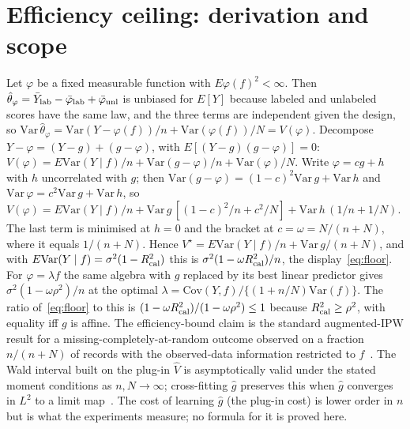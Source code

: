 \appendix
\section{Efficiency ceiling: derivation and scope}
\label{app:theory}
Let $\varphi$ be a fixed measurable function with $E\varphi(f)^2<\infty$. Then $\hat\theta_\varphi=\bar Y_{\rm lab}-\bar\varphi_{\rm lab}+\bar\varphi_{\rm unl}$ is unbiased for $E[Y]$ because labeled and unlabeled scores have the same law, and the three terms are independent given the design, so $\mathrm{Var}\,\hat\theta_\varphi=\mathrm{Var}(Y-\varphi(f))/n+\mathrm{Var}(\varphi(f))/N=V(\varphi)$. Decompose $Y-\varphi=(Y-g)+(g-\varphi)$, with $E[(Y-g)(g-\varphi)]=0$: $V(\varphi)=E\mathrm{Var}(Y\mid f)/n+\mathrm{Var}(g-\varphi)/n+\mathrm{Var}(\varphi)/N$. Write $\varphi=cg+h$ with $h$ uncorrelated with $g$; then $\mathrm{Var}(g-\varphi)=(1-c)^2\mathrm{Var}\,g+\mathrm{Var}\,h$ and $\mathrm{Var}\,\varphi=c^2\mathrm{Var}\,g+\mathrm{Var}\,h$, so $V(\varphi)=E\mathrm{Var}(Y\mid f)/n+\mathrm{Var}\,g\,[(1-c)^2/n+c^2/N]+\mathrm{Var}\,h\,(1/n+1/N)$. The last term is minimised at $h=0$ and the bracket at $c=\omega=N/(n+N)$, where it equals $1/(n+N)$. Hence $V^\star=E\mathrm{Var}(Y\mid f)/n+\mathrm{Var}\,g/(n+N)$, and with $E\mathrm{Var}(Y\mid f)=\sigma^2(1-R^2_{\rm cal})$ this is $\sigma^2(1-\omega R^2_{\rm cal})/n$, the display~\eqref{eq:floor}. For $\varphi=\lambda f$ the same algebra with $g$ replaced by its best linear predictor gives $\sigma^2(1-\omega\rho^2)/n$ at the optimal $\lambda=\mathrm{Cov}(Y,f)/\{(1+n/N)\mathrm{Var}(f)\}$. The ratio of~\eqref{eq:floor} to this is $(1-\omega R^2_{\rm cal})/(1-\omega\rho^2)\le1$ because $R^2_{\rm cal}\ge\rho^2$, with equality iff $g$ is affine. The efficiency-bound claim is the standard augmented-IPW result for a missing-completely-at-random outcome observed on a fraction $n/(n+N)$ of records with the observed-data information restricted to $f$~\citep{robins1994aipw,tsiatis2006}. The Wald interval built on the plug-in $\hat V$ is asymptotically valid under the stated moment conditions as $n,N\to\infty$; cross-fitting $\hat g$ preserves this when $\hat g$ converges in $L^2$ to a limit map~\citep{chernozhukov2018dml}. The cost of learning $\hat g$ (the plug-in cost) is lower order in $n$ but is what the experiments measure; no formula for it is proved here.

